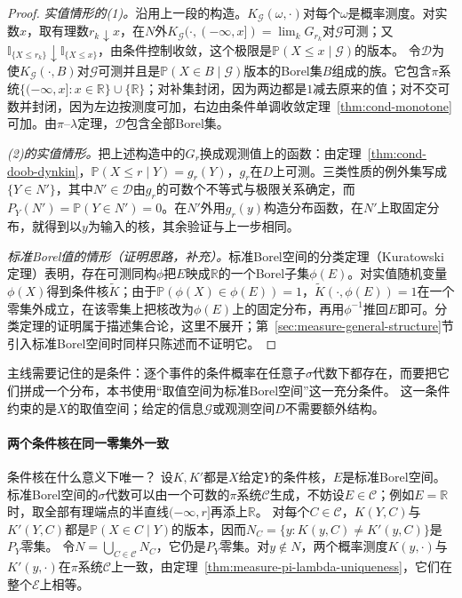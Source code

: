 \begin{proof}
\emph{实值情形的(1)。}沿用上一段的构造。$K_{\mathcal G}(\omega,\cdot)$对每个$\omega$是概率测度。对实数$x$，取有理数$r_k\downarrow x$，在$N$外$K_{\mathcal G}(\cdot,(-\infty,x])=\lim_kG_{r_k}$对$\mathcal G$可测；又$\mathbb I_{\{X\leq r_k\}}\downarrow\mathbb I_{\{X\leq x\}}$，由条件控制收敛，这个极限是$\mathbb P(X\leq x\mid\mathcal G)$的版本。
令$\mathcal D$为使$K_{\mathcal G}(\cdot,B)$对$\mathcal G$可测并且是$\mathbb P(X\in B\mid\mathcal G)$版本的Borel集$B$组成的族。它包含$\pi$系统$\{(-\infty,x]:x\in\mathbb R\}\cup\{\mathbb R\}$；对补集封闭，因为两边都是$1$减去原来的值；对不交可数并封闭，因为左边按测度可加，右边由条件单调收敛定理~\ref{thm:cond-monotone}可加。由$\pi$--$\lambda$定理，$\mathcal D$包含全部Borel集。

\emph{(2)的实值情形。}把上述构造中的$G_r$换成观测值上的函数：由定理~\ref{thm:cond-doob-dynkin}，$\mathbb P(X\leq r\mid Y)=g_r(Y)$，$g_r$在$D$上可测。三类性质的例外集写成$\{Y\in N'\}$，其中$N'\in\mathcal D$由$g_r$的可数个不等式与极限关系确定，而$P_Y(N')=\mathbb P(Y\in N')=0$。在$N'$外用$g_r(y)$构造分布函数，在$N'$上取固定分布，就得到以$y$为输入的核，其余验证与上一步相同。

\emph{标准Borel值的情形（证明思路，补充）。}标准Borel空间的分类定理（Kuratowski定理）表明，存在可测同构$\phi$把$E$映成$\mathbb R$的一个Borel子集$\phi(E)$。对实值随机变量$\phi(X)$得到条件核$\widetilde K$；由于$\mathbb P(\phi(X)\in\phi(E))=1$，$\widetilde K(\cdot,\phi(E))=1$在一个零集外成立，在该零集上把核改为$\phi(E)$上的固定分布，再用$\phi^{-1}$推回$E$即可。分类定理的证明属于描述集合论，这里不展开；第~\ref{sec:measure-general-structure}节引入标准Borel空间时同样只陈述而不证明它。
\end{proof}

主线需要记住的是条件：逐个事件的条件概率在任意子$\sigma$代数下都存在，而要把它们拼成一个分布，本书使用“取值空间为标准Borel空间”这一充分条件。
这一条件约束的是$X$的取值空间；给定的信息$\mathcal G$或观测空间$D$不需要额外结构。

\paragraph{两个条件核在同一零集外一致}
条件核在什么意义下唯一？
设$K,K'$都是$X$给定$Y$的条件核，$E$是标准Borel空间。
标准Borel空间的$\sigma$代数可以由一个可数的$\pi$系统$\mathcal C$生成，不妨设$E\in\mathcal C$；例如$E=\mathbb R$时，取全部有理端点的半直线$(-\infty,r]$再添上$\mathbb R$。
对每个$C\in\mathcal C$，$K(Y,C)$与$K'(Y,C)$都是$\mathbb P(X\in C\mid Y)$的版本，因而$N_C=\{y:K(y,C)\neq K'(y,C)\}$是$P_Y$零集。
令$N=\bigcup_{C\in\mathcal C}N_C$，它仍是$P_Y$零集。对$y\notin N$，两个概率测度$K(y,\cdot)$与$K'(y,\cdot)$在$\pi$系统$\mathcal C$上一致，由定理~\ref{thm:measure-pi-lambda-uniqueness}，它们在整个$\mathcal E$上相等。

